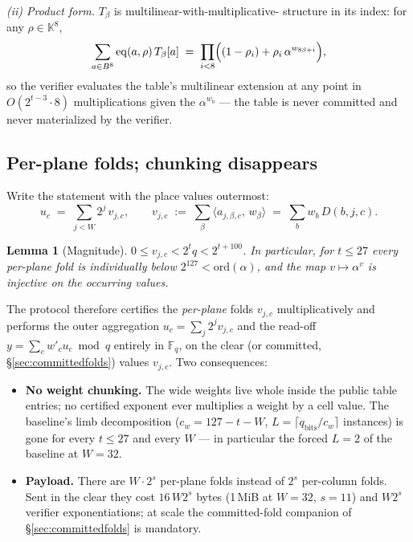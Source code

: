 \documentclass[11pt]{article}
\newtheorem{lemma}[theorem]{Lemma}
\theoremstyle{definition}
\newcommand{\K}{\mathbb{K}}
\newcommand{\F}{\mathbb{F}}
\newcommand{\eq}{\mathrm{eq}}
\newcommand{\ord}{\mathrm{ord}}
\newcommand{\ip}[2]{\langle #1,\, #2\rangle}
\begin{document}
\emph{(ii) Product form.} $T_\beta$ is multilinear-with-multiplicative-
structure in its index: for any $\rho\in\K^8$,
\begin{equation}\label{eq:closedform}
\sum_{a\in B^8}\eq(a,\rho)\,T_\beta[a]
\;=\; \prod_{i<8}\Bigl((1-\rho_i) + \rho_i\,\alpha^{w_{8\beta+i}}\Bigr),
\end{equation}
so the verifier evaluates the table's multilinear extension at any point
in $O(2^{t-3}\cdot 8)$ multiplications given the $\alpha^{w_b}$ --- the
table is never committed and never materialized by the verifier.

\subsection{Per-plane folds; chunking disappears}

Write the statement with the place values outermost:
\begin{equation}\label{eq:switched}
u_c \;=\; \sum_{j<W} 2^j\, v_{j,c},
\qquad
v_{j,c} \;:=\; \sum_{\beta}\ip{a_{j,\beta,c}}{w_\beta}
\;=\; \sum_b w_b\, D(b,j,c) .
\end{equation}

\begin{lemma}[Magnitude]\label{lem:magnitude}
$0\le v_{j,c} < 2^t q < 2^{t+100}$. In particular, for $t\le 27$ every
per-plane fold is individually below $2^{127}<\ord(\alpha)$, and the map
$v\mapsto\alpha^v$ is injective on the occurring values.
\end{lemma}

The protocol therefore certifies the \emph{per-plane} folds $v_{j,c}$
multiplicatively and performs the outer aggregation
$u_c=\sum_j 2^j v_{j,c}$ and the read-off
$y=\sum_c w'_c u_c \bmod q$ entirely in $\F_q$, on the clear (or
committed, \S\ref{sec:committedfolds}) values $v_{j,c}$. Two consequences:

\begin{itemize}
\item \textbf{No weight chunking.} The wide weights live whole inside the
public table entries; no certified exponent ever multiplies a weight by a
cell value. The baseline's limb decomposition
($c_w = 127-t-W$, $L=\lceil q_{\mathrm{bits}}/c_w\rceil$ instances) is
gone for every $t\le 27$ and every $W$ --- in particular the forced
$L=2$ of the baseline at $W=32$.
\item \textbf{Payload.} There are $W\cdot 2^s$ per-plane folds instead of
$2^s$ per-column folds. Sent in the clear they cost $16\,W2^s$ bytes
(1\,MiB at $W=32$, $s=11$) and $W2^s$ verifier exponentiations; at scale
the committed-fold companion of \S\ref{sec:committedfolds} is mandatory.
\end{itemize}
\end{document}
